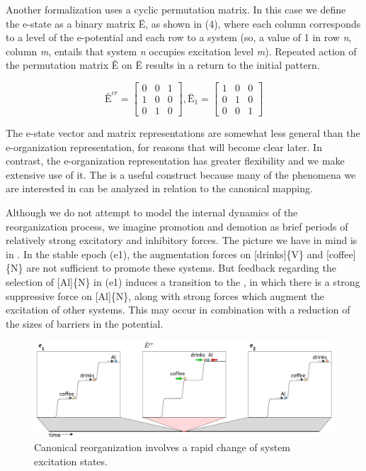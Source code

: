   Another formalization uses a cyclic permutation matrix. In this case we define the e-state as a binary matrix Ë, as shown in (4), where each column corresponds to a level of the e-potential and each row to a system (so, a value of 1 in row \textit{n}, column \textit{m}, entails that system \textit{n} occupies excitation level \textit{m}). Repeated action of the permutation matrix Ê on Ë results in a return to the initial pattern. 

\ea
$$
\text{Ê}^{{cr}}=
\left[
  \begin{matrix}
  0 & 0 & 1\\
  1 & 0 & 0\\
  0 & 1 & 0
  \end{matrix}
\right],
{\text{Ë}}_{1}=
\left[
  \begin{matrix}
  1 & 0 & 0\\
  0 & 1 & 0\\
  0 & 0 & 1
  \end{matrix}
\right]
$$
\z


  The e-state vector and matrix representations are somewhat less general than the e-organization representation, for reasons that will become clear later. In contrast, the e-organization representation has greater flexibility and we make extensive use of it. The  is a useful construct because many of the phenomena we are interested in can be analyzed in relation to the canonical mapping.

  Although we do not attempt to model the internal dynamics of the reorganization process, we imagine promotion and demotion as brief periods of relatively strong excitatory and inhibitory forces. The picture we have in mind is in {}. In the stable epoch (e1), the augmentation forces on [drinks]\{V\} and [coffee]\{N\} are not sufficient to promote these systems. But feedback regarding the selection of [Al]\{N\} in (e1) induces a transition to the , in which there is a strong suppressive force on [Al]\{N\}, along with strong forces which augment the excitation of other systems. This may occur in combination with a reduction of the sizes of barriers in the potential. 

  
\begin{figure}
\includegraphics[width=\textwidth]{figures/Tilsen-img26.png}
\caption{Canonical reorganization involves a rapid change of system excitation states.}
\label{fig:2:19}
\end{figure}
 

